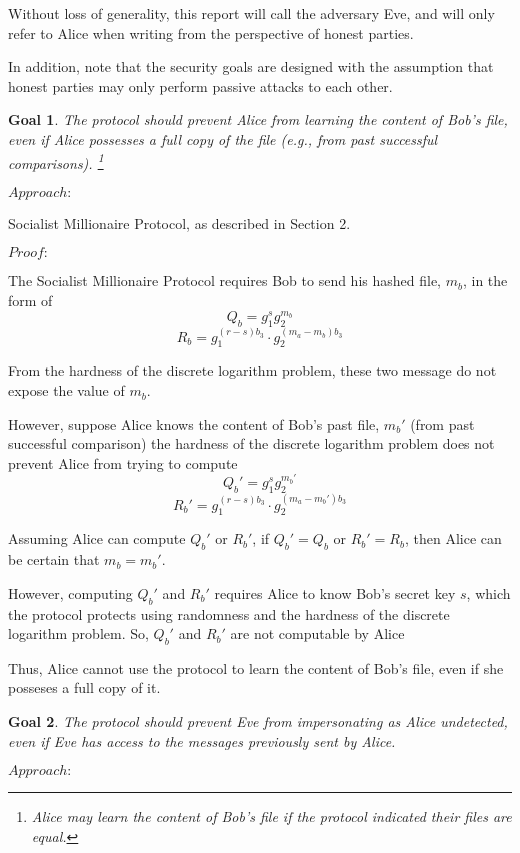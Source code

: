 \documentclass{article}
\newtheorem{goal}{Goal}
\begin{document}
Without loss of generality, this report will call the adversary Eve, and will only 
refer to Alice when writing from the perspective of honest parties. 

In addition, note that 
the security goals are designed with the assumption that honest parties may only
perform passive attacks to each other.

\begin{goal}
The protocol should prevent Alice from learning the content of Bob's file, even if 
Alice possesses a full copy of the file (e.g., from past successful comparisons). 
\footnote{Alice may learn the content of Bob's file if the protocol indicated
their files are equal.}
\end{goal}

$Approach:$ 

Socialist Millionaire Protocol, as described in Section 2.

$Proof:$

The Socialist Millionaire Protocol requires Bob to send his hashed file, $m_b$, in the 
form of 
$$Q_b = g_1^sg_2^{m_b}$$ 
$$R_{b} = g_1^{(r-s)b_3} \cdot g_2^{(m_a-m_b)b_3}$$ 

From the hardness of the discrete logarithm problem, these two message do not expose 
the value of $m_b$.

However, suppose Alice knows the content of Bob's past file, $m_b'$ (from past successful 
comparison) the hardness of the discrete logarithm problem does not prevent Alice from 
trying to compute $$Q_b' = g_1^sg_2^{m_b'}$$
$$R_{b}' = g_1^{(r-s)b_3} \cdot g_2^{(m_a-m_b')b_3}$$ 

Assuming Alice can compute $Q_b'$ or $R_b'$, if $Q_b' = Q_b$ or $R_b' = R_b$, 
then Alice can be certain that $m_b = m_b'$.

However, computing $Q_b'$ and $R_b'$ requires Alice to know Bob's secret key $s$, which the 
protocol protects using randomness and the hardness of the discrete logarithm problem. So,
$Q_b'$ and $R_b'$ are not computable by Alice

Thus, Alice cannot use the protocol to learn the content of Bob's file, even if she posseses 
a full copy of it.

\begin{goal}
The protocol should prevent Eve from impersonating as Alice undetected, even if Eve 
has access to the messages previously sent by Alice.
\end{goal}

$Approach:$
\end{document}
